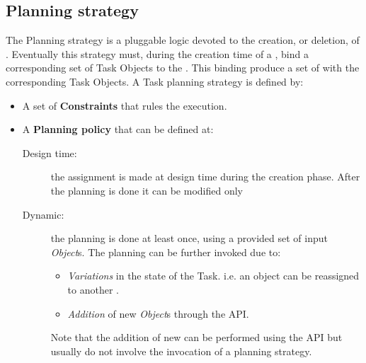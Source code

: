 \subsection{\utask{} Planning strategy}
The \utask{} Planning strategy is a pluggable logic devoted to the creation, or
deletion, of \utask{}. Eventually this strategy must, during the creation
time of a \utask{}, bind a corresponding set of Task Objects to the \utask{}.
This binding produce a set of \utask{} with the corresponding Task Objects. A
Task planning strategy is defined by:
\begin{itemize}
    \item A set of \textbf{Constraints} that rules the execution.

    \item A \textbf{Planning policy} that can be defined at:
        \begin{description}
            \item[Design time:] the assignment is made at design time during the
            creation phase. After the planning is done it can be modified only

            \item[Dynamic:] the planning is done at least once, using a provided
            set of input \emph{Object}s. The planning can be further invoked due
            to:
            \begin{itemize}
                \item \emph{Variations} in the state of the Task. i.e. an object
                can be reassigned to another \utask{}.

                \item \emph{Addition} of new \emph{Object}s through the API.
            \end{itemize}
            Note that the addition of new \utask{} can be performed using the
            API but usually do not involve the invocation of a \utask{} planning
            strategy.
        \end{description}
\end{itemize}



